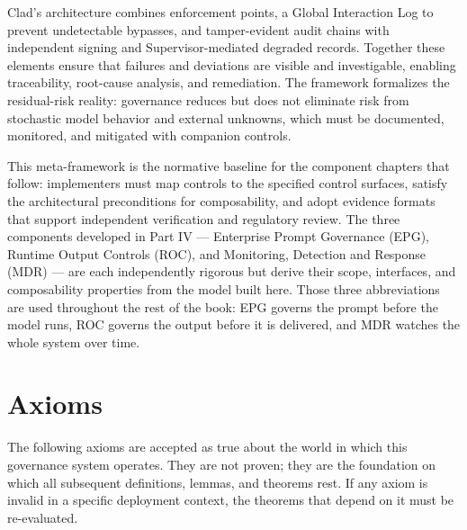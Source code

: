 Clad's architecture combines enforcement points, a Global Interaction Log to prevent undetectable bypasses, and tamper-evident audit chains with independent signing and Supervisor-mediated degraded records. Together these elements ensure that failures and deviations are visible and investigable, enabling traceability, root-cause analysis, and remediation. The framework formalizes the residual-risk reality: governance reduces but does not eliminate risk from stochastic model behavior and external unknowns, which must be documented, monitored, and mitigated with companion controls.

This meta-framework is the normative baseline for the component chapters that follow: implementers must map controls to the specified control surfaces, satisfy the architectural preconditions for composability, and adopt evidence formats that support independent verification and regulatory review. The three components developed in Part IV --- Enterprise Prompt Governance (EPG), Runtime Output Controls (ROC), and Monitoring, Detection and Response (MDR) --- are each independently rigorous but derive their scope, interfaces, and composability properties from the model built here. Those three abbreviations are used throughout the rest of the book: EPG governs the prompt before the model runs, ROC governs the output before it is delivered, and MDR watches the whole system over time.



\section{Axioms}
\label{sec:framework-1}


The following axioms are accepted as true about the world in which this governance system operates. They are not proven; they are the foundation on which all subsequent definitions, lemmas, and theorems rest. If any axiom is invalid in a specific deployment context, the theorems that depend on it must be re-evaluated.

